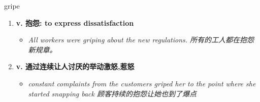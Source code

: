 
\begin{frame}
{\huge gripe}
\begin{center}
\begin{enumerate}\Large
  \item \textbf{v. 抱怨: to express dissatisfaction}
  \begin{itemize}
    \item \em{\Large{All workers were griping about the new regulations. 所有的工人都在抱怨新规章。}}
  \end{itemize}
  \item \textbf{v. 通过连续让人讨厌的举动激怒,惹怒}
  \begin{itemize}
    \item \em{\Large{constant complaints from the customers griped her to the point where she started snapping back 顾客持续的抱怨让她也到了爆点}}
  \end{itemize}
\end{enumerate}
\end{center}
\end{frame}
